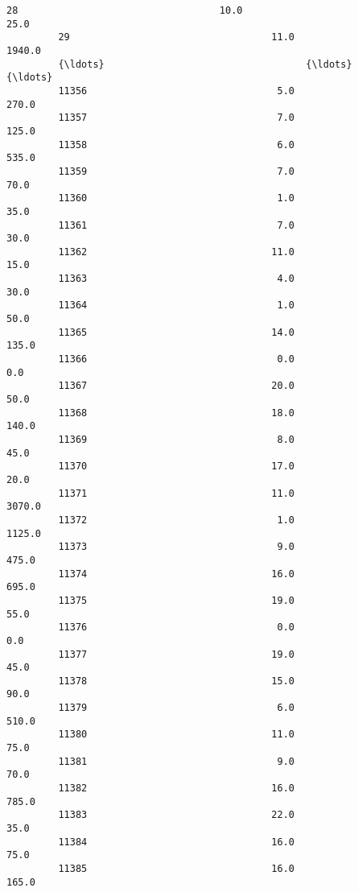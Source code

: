 \documentclass[11pt]{article}
\begin{document}
\begin{Verbatim}[commandchars=\\\{\}]
         28                                   10.0                               25.0   
         29                                   11.0                             1940.0   
         {\ldots}                                   {\ldots}                                {\ldots}   
         11356                                 5.0                              270.0   
         11357                                 7.0                              125.0   
         11358                                 6.0                              535.0   
         11359                                 7.0                               70.0   
         11360                                 1.0                               35.0   
         11361                                 7.0                               30.0   
         11362                                11.0                               15.0   
         11363                                 4.0                               30.0   
         11364                                 1.0                               50.0   
         11365                                14.0                              135.0   
         11366                                 0.0                                0.0   
         11367                                20.0                               50.0   
         11368                                18.0                              140.0   
         11369                                 8.0                               45.0   
         11370                                17.0                               20.0   
         11371                                11.0                             3070.0   
         11372                                 1.0                             1125.0   
         11373                                 9.0                              475.0   
         11374                                16.0                              695.0   
         11375                                19.0                               55.0   
         11376                                 0.0                                0.0   
         11377                                19.0                               45.0   
         11378                                15.0                               90.0   
         11379                                 6.0                              510.0   
         11380                                11.0                               75.0   
         11381                                 9.0                               70.0   
         11382                                16.0                              785.0   
         11383                                22.0                               35.0   
         11384                                16.0                               75.0   
         11385                                16.0                              165.0   
         

\end{Verbatim}
\end{document}
